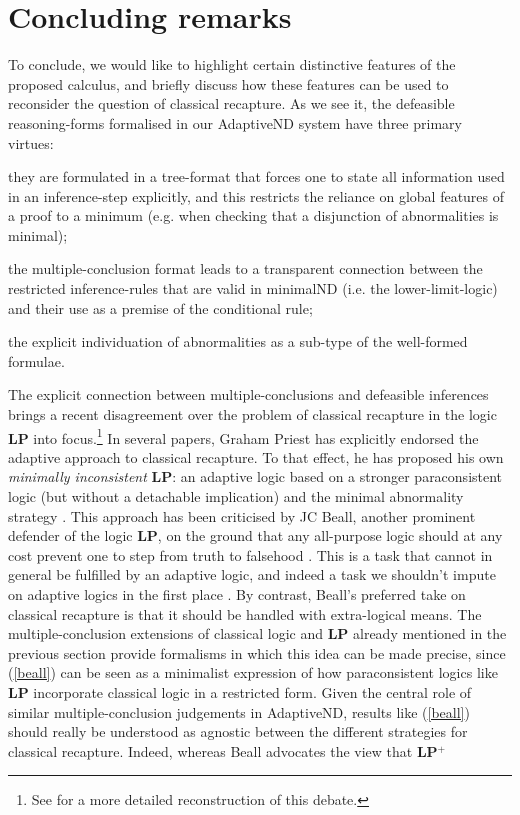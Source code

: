\documentclass[]{article}
\begin{document}
\section{Concluding remarks}\label{sec:recap}
To conclude, we would like to highlight certain distinctive features of the proposed calculus, and briefly discuss how these features can be used to reconsider the question of classical recapture. As we see it, the defeasible reasoning-forms formalised in our \textsf{AdaptiveND} system have three primary virtues:
\begin{enumerate*}
    \item they are formulated in a tree-format that forces one to state all information used in an inference-step explicitly, and this restricts the reliance on global features of a proof to a minimum (e.g. when checking that a disjunction of abnormalities is minimal);
    \item the multiple-conclusion format leads to a transparent connection between the restricted inference-rules that are valid in \textsf{minimalND} (i.e. the lower-limit-logic) and their use as a premise of the conditional rule;
    \item the explicit individuation of abnormalities as a sub-type of the well-formed formulae.
\end{enumerate*}
The explicit connection between multiple-conclusions and defeasible inferences brings a recent disagreement over the problem of classical recapture in the logic \textbf{LP} into focus.\footnote{See \cite[18ff]{Allo:Theoria:2015} for a more detailed reconstruction of this debate.} In several papers, Graham Priest has explicitly endorsed the adaptive approach to classical recapture. To that effect, he has proposed his own \emph{minimally inconsistent} \textbf{LP}: an adaptive logic based on a stronger paraconsistent logic (but without a detachable implication) and the minimal abnormality strategy \cite{GP:LPm}. This approach has been criticised by JC Beall, another prominent defender of the logic \textbf{LP}, on the ground that any all-purpose logic should at any cost prevent one to step from truth to falsehood \cite{Beall01072012}. This is a task that cannot in general be fulfilled by an adaptive logic, and indeed a task we shouldn't impute on adaptive logics in the first place \cite{Priest01102012}. By contrast, Beall's preferred take on classical recapture is that it should be handled with extra-logical means. The multiple-conclusion extensions of classical logic and \textbf{LP} already mentioned in the previous section provide formalisms in which this idea can be made precise, since (\ref{beall}) can be seen as a minimalist expression of how paraconsistent logics like \textbf{LP} incorporate classical logic in a restricted form. Given the central role of similar multiple-conclusion judgements in \textsf{AdaptiveND}, results like (\ref{beall}) should really be understood as agnostic between the different strategies for classical recapture. Indeed, whereas Beall advocates the view that \textbf{LP$^+$}
\end{document}

